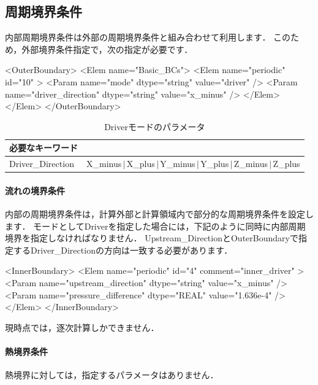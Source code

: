\subsection{周期境界条件}
内部周期境界条件は外部の周期境界条件と組み合わせて利用します．
このため，外部境界条件指定で，次の指定が必要です．

{\small
\begin{program}
<OuterBoundary>
  <Elem name="Basic_BCs">
    <Elem name="periodic" id="10" >
      <Param name="mode"             dtype="string" value="driver" />
      <Param name="driver_direction" dtype="string" value="x_minus" />
    </Elem>
  </Elem>
</OuterBoundary>
\end{program}
}

\begin{table}[htdp]
\caption{Driverモードのパラメータ}
\begin{center}
\small
\begin{tabular}{ll} \toprule
必要なキーワード \\ \midrule
Driver\_Direction & X\_minus$\,|\,$X\_plus$\,|\,$Y\_minus$\,|\,$Y\_plus$\,|\,$Z\_minus$\,|\,$Z\_plus\\ \bottomrule
\end{tabular}
\end{center}
\label{tbl:parameter driver mode}
\end{table}

\paragraph{流れの境界条件}
内部の周期境界条件は，計算外部と計算領域内で部分的な周期境界条件を設定します．
モードとしてDriverを指定した場合には，下記のように同時に内部周期境界を指定しなければなりません．
Upstream\_DirectionとOuterBoundaryで指定するDriver\_Directionの方向は一致する必要があります．

{\small
\begin{program}
<InnerBoundary>
  <Elem name="periodic" id="4" comment="inner_driver" >
    <Param name="upstream_direction"  dtype="string" value="x_minus" />
    <Param name="pressure_difference" dtype="REAL"   value="1.636e-4" />
  </Elem>
</InnerBoundary>
\end{program}
}

現時点では，逐次計算しかできません．

\paragraph{熱境界条件}
熱境界に対しては，指定するパラメータはありません．


